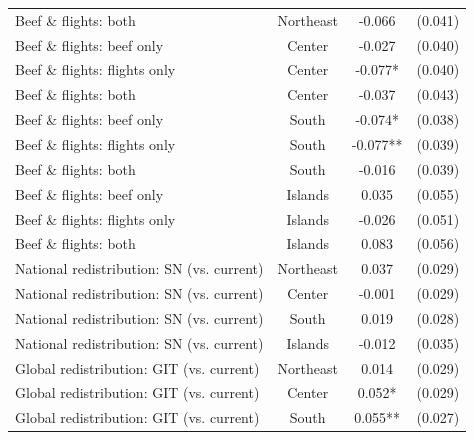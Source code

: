 \begin{table}[H]
\begin{tabular}{ l c c c }
\hspace{0.05cm} Beef \& flights: both & Northeast & -0.066 & (0.041) \\
\hspace{0.05cm} Beef \& flights: beef only & Center & -0.027 & (0.040) \\
\hspace{0.05cm} Beef \& flights: flights only & Center & -0.077* & (0.040) \\
\hspace{0.05cm} Beef \& flights: both & Center & -0.037 & (0.043) \\
\hspace{0.05cm} Beef \& flights: beef only & South & -0.074* & (0.038) \\
\hspace{0.05cm} Beef \& flights: flights only & South & -0.077** & (0.039) \\
\hspace{0.05cm} Beef \& flights: both & South & -0.016 & (0.039) \\
\hspace{0.05cm} Beef \& flights: beef only & Islands & 0.035 & (0.055) \\
\hspace{0.05cm} Beef \& flights: flights only & Islands & -0.026 & (0.051) \\
\hspace{0.05cm} Beef \& flights: both & Islands & 0.083 & (0.056) \\
\hspace{0.05cm} National redistribution: SN (vs. current) & Northeast & 0.037 & (0.029) \\
\hspace{0.05cm} National redistribution: SN (vs. current) & Center & -0.001 & (0.029) \\
\hspace{0.05cm} National redistribution: SN (vs. current) & South & 0.019 & (0.028) \\
\hspace{0.05cm} National redistribution: SN (vs. current) & Islands & -0.012 & (0.035) \\
\hspace{0.05cm} Global redistribution: GIT (vs. current) & Northeast & 0.014 & (0.029) \\
\hspace{0.05cm} Global redistribution: GIT (vs. current) & Center & 0.052* & (0.029) \\
\hspace{0.05cm} Global redistribution: GIT (vs. current) & South & 0.055** & (0.027) \\

\end{tabular}
\end{table}
